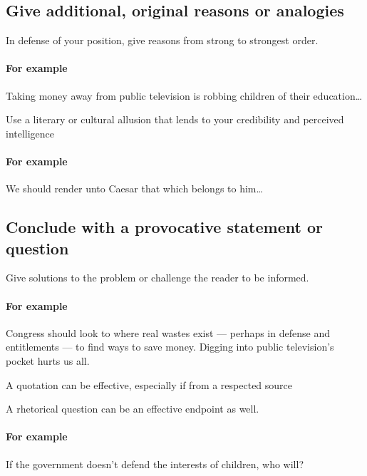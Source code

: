 \documentclass{tufte-handout}\usepackage[]{graphicx}\usepackage[]{color}
\newenvironment{itemize*}%
  {\begin{itemize}%
    \setlength{\itemsep}{0pt}%
    \setlength{\parskip}{0pt}}%
  {\end{itemize}}
\begin{document}
\subsection{Give additional, original reasons or analogies}

\begin{itemize*}
	\item In defense of your position, give reasons from strong to strongest order. 
	
\paragraph{For example} Taking money away from public television is robbing children of their education\ldots

	\item Use a literary or cultural allusion that lends to your credibility and perceived intelligence 
	
\paragraph{For example} We should render unto Caesar that which belongs to him\ldots
\end{itemize*}

\subsection{Conclude with a provocative statement or question}

\begin{itemize*}
	\item Give solutions to the problem or challenge the reader to be informed.
	
	\paragraph{For example} Congress should look to where real wastes exist --- perhaps in defense and entitlements --- to find ways to save money. Digging into public television's pocket hurts us all.
	
	\item A quotation can be effective, especially if from a respected source

	\item A rhetorical question can be an effective endpoint as well.
	
	\paragraph{For example} If the government doesn't defend the interests of children, who will?
\end{itemize*}
\end{document}
